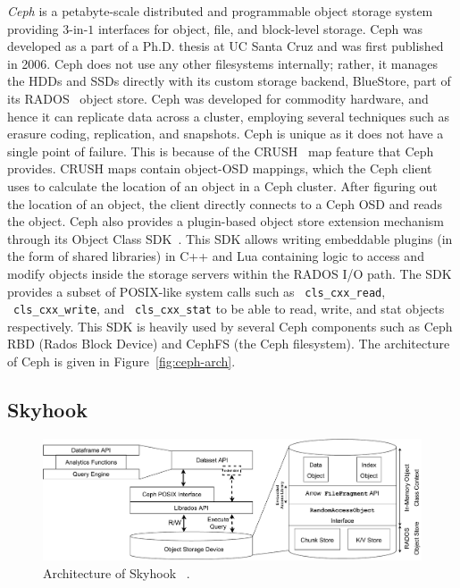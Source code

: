 \documentclass[12pt]{article}
\newcommand{\code}[1]{\colorbox{light-gray}{\texttt{#1}}}
\begin{document}
\textit{Ceph} is a petabyte-scale distributed and programmable object storage system providing $3$-in-$1$ interfaces for object, file, and block-level storage. Ceph was developed as a part of a Ph.D. thesis at UC Santa Cruz and was first published in 2006. Ceph does not use any other filesystems internally; rather, it manages the HDDs and SSDs directly with its custom storage backend, BlueStore, part of its RADOS~\cite{weil2007rados} object store. Ceph was developed for commodity hardware, and hence it can replicate data across a cluster, employing several techniques such as erasure coding, replication, and snapshots. Ceph is unique as it does not have a single point of failure. This is because of the CRUSH~\cite{weil2006crush} map feature that Ceph provides. CRUSH maps contain object-OSD mappings, which the Ceph client uses to calculate the location of an object in a Ceph cluster. After figuring out the location of an object, the client directly connects to a Ceph OSD and reads the object. Ceph also provides a plugin-based object store extension mechanism through its Object Class SDK~\cite{objectclasssdk}. This SDK allows writing embeddable plugins (in the form of shared libraries) in C++ and Lua containing logic to access and modify objects inside the storage servers within the RADOS I/O path. The SDK provides a subset of POSIX-like system calls such as ~\code{cls\_cxx\_read}, ~\code{cls\_cxx\_write}, and ~\code{cls\_cxx\_stat} to be able to read, write, and stat objects respectively. This SDK is heavily used by several Ceph components such as Ceph RBD (Rados Block Device) and CephFS (the Ceph filesystem). The architecture of Ceph is given in Figure~\ref{fig:ceph-arch}.

\subsection{Skyhook}
\begin{figure}[h]
\centering
\includegraphics[width=\textwidth]{figs/implarch.pdf}
\caption{Architecture of Skyhook ~\cite{jc2022skyhook}.}
\label{fig:skyhook-arch}
\end{figure}
\end{document}
